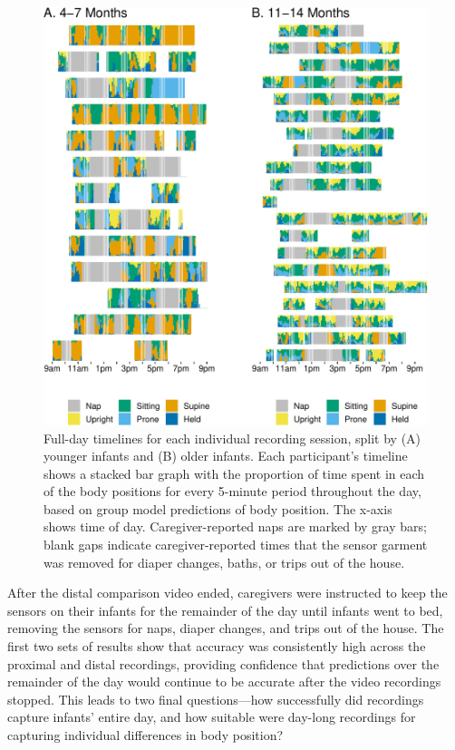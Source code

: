 \documentclass[
  man]{apa6}
\begin{document}
\begin{figure}

{\centering \includegraphics{manuscript_files/figure-latex/timelines-1} 

}

\caption{Full-day timelines for each individual recording session, split by (A) younger infants and (B) older infants. Each participant's timeline shows a stacked bar graph with the proportion of time spent in each of the body positions for every 5-minute period throughout the day, based on group model predictions of body position. The x-axis shows time of day. Caregiver-reported naps are marked by gray bars; blank gaps indicate caregiver-reported times that the sensor garment was removed for diaper changes, baths, or trips out of the house.}\label{fig:timelines}
\end{figure}

After the distal comparison video ended, caregivers were instructed to keep the sensors on their infants for the remainder of the day until infants went to bed, removing the sensors for naps, diaper changes, and trips out of the house. The first two sets of results show that accuracy was consistently high across the proximal and distal recordings, providing confidence that predictions over the remainder of the day would continue to be accurate after the video recordings stopped. This leads to two final questions---how successfully did recordings capture infants' entire day, and how suitable were day-long recordings for capturing individual differences in body position?
\end{document}
